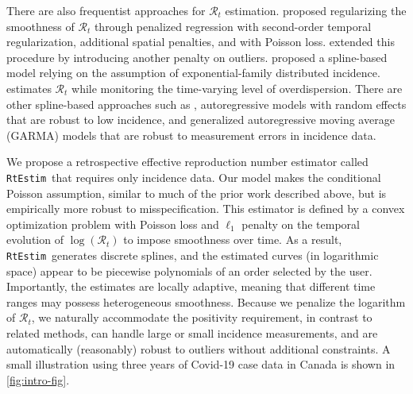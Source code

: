 \documentclass[10pt,letterpaper]{article}
\def\RtEstim{\texttt{RtEstim}}
\def\calR{\mathcal{R}}
\newcommand{\citep}[1]{\cite{#1}}
\begin{document}
There are also frequentist approaches for $\calR_t$ estimation.
\cite{abry2020spatial} proposed regularizing the smoothness of $\calR_t$ through
penalized regression with second-order temporal regularization, additional
spatial penalties, and with Poisson loss. \cite{pascal2022nonsmooth} extended
this procedure by introducing another penalty on outliers.
\cite{pircalabelu2023spline} proposed a spline-based model relying on the
assumption of exponential-family distributed incidence. \cite{ho2023accounting}
estimates $\calR_t$ while monitoring the time-varying level of overdispersion.
There are other spline-based approaches such as
\cite{azmon2014estimation,gressani2021approximate}, autoregressive models with
random effects \citep{jin2023epimix} that are robust to low incidence, and
generalized autoregressive moving average (GARMA) models
\citep{hettinger2023estimating} that are robust to measurement errors in
incidence data. 


We propose a retrospective effective reproduction number estimator
called \RtEstim\ that requires only incidence data. Our model makes the
conditional Poisson assumption, similar to much of the prior work described
above, but is empirically more robust to misspecification. This estimator is 
defined by a convex optimization problem with Poisson loss and $\ell_1$ penalty 
on the temporal evolution of $\log(\calR_t)$ to impose smoothness over time. 
As a result, \RtEstim\ generates discrete splines, and the estimated curves (in
logarithmic space) appear to be piecewise polynomials of an order selected by the
user. Importantly, the estimates are locally adaptive, meaning that different
time ranges may possess heterogeneous smoothness. Because we penalize the
logarithm of $\calR_t$, we naturally accommodate the positivity requirement, in
contrast to related methods, can
handle large or small incidence measurements, and are automatically (reasonably)
robust to outliers without additional constraints. A small illustration using
three years of Covid-19 case data in Canada is shown in \autoref{fig:intro-fig}.
\end{document}
